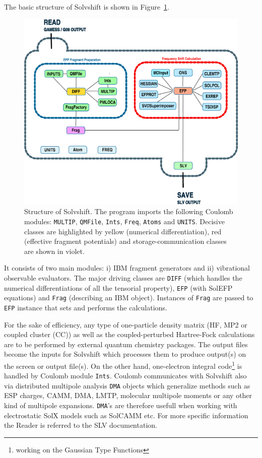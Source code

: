\documentclass[a4paper,titlepage,twoside,fleqn,12pt]{book}
\begin{document}
\begin{refsection}
The basic structure of {\sc Solvshift} is shown
in Figure~\ref{f:slv-structure}.
%
\begin{figure}[t!]
\centering
\setlength\fboxsep{0.4pt}
\setlength\fboxrule{0.5pt}
\includegraphics[width=0.90\linewidth]{slv-diagram.eps}
\caption{
Structure of {\sc Solvshift}. The program imports the following 
{\sc Coulomb} modules: {\tt MULTIP}, {\tt QMFile}, {\tt Ints}, 
{\tt Freq}, {\tt Atoms} and {\tt UNITS}. Decisive classes
are highlighted by yellow (numerical differentiation), 
red (effective fragment potentials) and storage\hyp{}communication
classes are shown in violet.
\label{f:slv-structure}}
\end{figure}
%
It consists of two main modules: i) IBM fragment generators 
and ii) vibrational observable evaluators. The major driving classes
are {\tt DIFF} (which handles the numerical differentiations of
all the tensorial property), {\tt EFP} (with SolEFP equations)
and {\tt Frag} (describing an IBM object). Instances of {\tt Frag} are passed to
{\tt EFP} instance that sets and performs the calculations.

For the sake of efficiency, any type of one\hyp{}particle
density matrix (HF, MP2 or coupled cluster (CC))
as well as the coupled\hyp{}perturbed Hartree\hyp{}Fock calculations
are to be performed by external quantum chemistry packages.
The output files become the inputs for {\sc Solvshift}
which
processes them to produce output(s) on the screen
or output file(s).
On the other hand, one\hyp{}electron integral 
code\footnote{working on
the Gaussian Type Functions} is handled by {\sc Coulomb}
module \verb+Ints+. {\sc Coulomb} communicates with {\sc Solvshift}
also via distributed multipole analysis \verb+DMA+ objects which generalize
methods such as ESP charges, CAMM, DMA, LMTP, molecular multipole
moments or any other kind of multipole expansions. 
\verb+DMA+'s are therefore usefull when working with
electrostatic SolX models such as SolCAMM etc.
For more specific information the Reader is referred 
to the SLV documentation.


\end{refsection}
\end{document}
